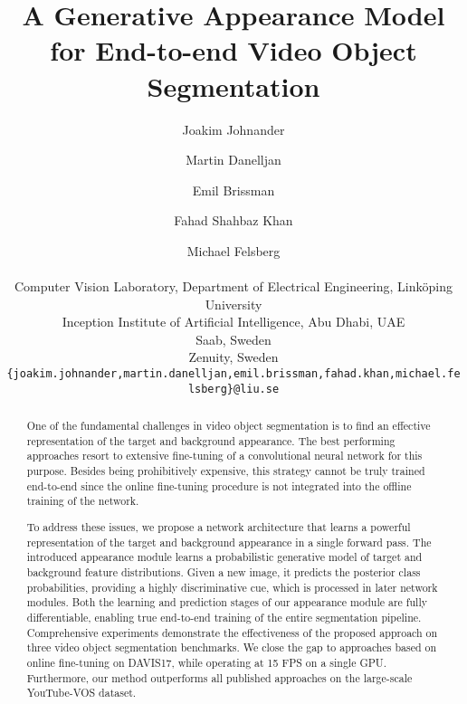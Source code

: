 \documentclass[10pt,twocolumn,letterpaper]{article}
\begin{document}
\title{A Generative Appearance Model for End-to-end Video Object Segmentation}

\author{Joakim Johnander\\
\and
Martin Danelljan\\
\and
Emil Brissman\\
\and
Fahad Shahbaz Khan\\
\and
Michael Felsberg\\
\\
 Computer Vision Laboratory, Department of Electrical Engineering, Linköping University\\
 Inception Institute of Artificial Intelligence, Abu Dhabi, UAE\\
 Saab, Sweden\\
 Zenuity, Sweden\\
{\tt\small \{joakim.johnander,martin.danelljan,emil.brissman,fahad.khan,michael.felsberg\}@liu.se}\\
}

\maketitle

\begin{abstract}
  One of the fundamental challenges in video object segmentation is to find an effective representation of the target and background appearance. The best performing approaches resort to extensive fine-tuning of a convolutional neural network for this purpose. Besides being prohibitively expensive, this strategy cannot be truly trained end-to-end since the online fine-tuning procedure is not integrated into the offline training of the network.

To address these issues, we propose a network architecture that learns a powerful representation of the target and background appearance in a single forward pass. The introduced appearance module learns a probabilistic generative model of target and background feature distributions. Given a new image, it predicts the posterior class probabilities, providing a highly discriminative cue, which is processed in later network modules. Both the learning and prediction stages of our appearance module are fully differentiable, enabling true end-to-end training of the entire segmentation pipeline. Comprehensive experiments demonstrate the effectiveness of the proposed approach on three video object segmentation benchmarks. We close the gap to approaches based on online fine-tuning on DAVIS17, while operating at 15 FPS on a single GPU. Furthermore, our method outperforms all published approaches on the large-scale YouTube-VOS dataset.

 \end{abstract}
\end{document}
